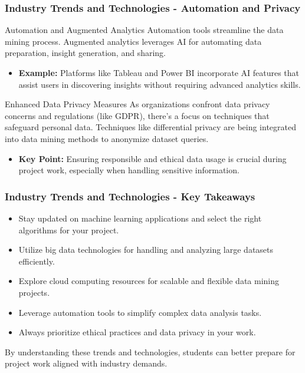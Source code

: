 \documentclass{beamer}
\begin{document}
\begin{frame}[fragile]
    \frametitle{Industry Trends and Technologies - Automation and Privacy}
    \begin{block}{Automation and Augmented Analytics}
        Automation tools streamline the data mining process. Augmented analytics leverages AI for automating data preparation, insight generation, and sharing.
    \end{block}
    \begin{itemize}
        \item \textbf{Example:} Platforms like Tableau and Power BI incorporate AI features that assist users in discovering insights without requiring advanced analytics skills.
    \end{itemize}
    
    \begin{block}{Enhanced Data Privacy Measures}
        As organizations confront data privacy concerns and regulations (like GDPR), there's a focus on techniques that safeguard personal data.
        Techniques like differential privacy are being integrated into data mining methods to anonymize dataset queries.
    \end{block}
    \begin{itemize}
        \item \textbf{Key Point:} Ensuring responsible and ethical data usage is crucial during project work, especially when handling sensitive information.
    \end{itemize}
\end{frame}

\begin{frame}[fragile]
    \frametitle{Industry Trends and Technologies - Key Takeaways}
    \begin{itemize}
        \item Stay updated on machine learning applications and select the right algorithms for your project.
        \item Utilize big data technologies for handling and analyzing large datasets efficiently.
        \item Explore cloud computing resources for scalable and flexible data mining projects.
        \item Leverage automation tools to simplify complex data analysis tasks.
        \item Always prioritize ethical practices and data privacy in your work.
    \end{itemize}
    
    By understanding these trends and technologies, students can better prepare for project work aligned with industry demands.
\end{frame}
\end{document}
